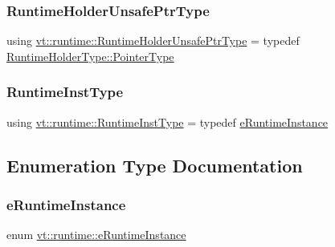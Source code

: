 \mbox{\label{namespacevt_1_1runtime_a69931905b04961a874e4a70a43083a83}} 
\subsubsection{\texorpdfstring{Runtime\+Holder\+Unsafe\+Ptr\+Type}{RuntimeHolderUnsafePtrType}}
{\footnotesize\ttfamily using \hyperlink{namespacevt_1_1runtime_a69931905b04961a874e4a70a43083a83}{vt\+::runtime\+::\+Runtime\+Holder\+Unsafe\+Ptr\+Type} = typedef \hyperlink{structvt_1_1runtime_1_1_runtime_holder_a9740e8aa7487fcf38b67a7e160d7b046}{Runtime\+Holder\+Type\+::\+Pointer\+Type}}

\mbox{\label{namespacevt_1_1runtime_a012376d47cd009c2e6305f17de9fcfe9}} 
\subsubsection{\texorpdfstring{Runtime\+Inst\+Type}{RuntimeInstType}}
{\footnotesize\ttfamily using \hyperlink{namespacevt_1_1runtime_afca910c1b38b3975f7c1da8001a77d58}{vt\+::runtime\+::\+Runtime\+Inst\+Type} = typedef \hyperlink{namespacevt_1_1runtime_afca910c1b38b3975f7c1da8001a77d58}{e\+Runtime\+Instance}}



\subsection{Enumeration Type Documentation}
\mbox{\label{namespacevt_1_1runtime_afca910c1b38b3975f7c1da8001a77d58}} 
\subsubsection{\texorpdfstring{e\+Runtime\+Instance}{eRuntimeInstance}}
{\footnotesize\ttfamily enum \hyperlink{namespacevt_1_1runtime_afca910c1b38b3975f7c1da8001a77d58}{vt\+::runtime\+::e\+Runtime\+Instance}}

